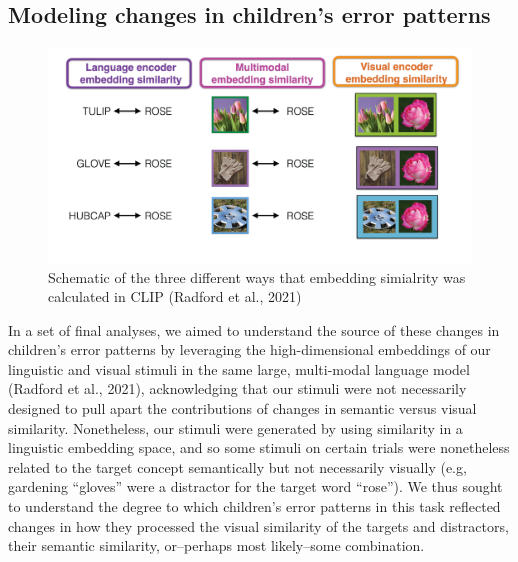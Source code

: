 \documentclass[
  man,floatsintext]{apa6}
\begin{document}
\subsection{Modeling changes in children's error patterns}\label{modeling-changes-in-childrens-error-patterns}

\begin{figure}[H]

{\centering \includegraphics[width=1\linewidth]{embedding_similarity} 

}

\caption{Schematic of the three different ways that embedding simialrity was calculated in CLIP (Radford et al., 2021)}\label{fig:clip-figure}
\end{figure}

In a set of final analyses, we aimed to understand the source of these changes in children's error patterns by leveraging the high-dimensional embeddings of our linguistic and visual stimuli in the same large, multi-modal language model (Radford et al., 2021), acknowledging that our stimuli were not necessarily designed to pull apart the contributions of changes in semantic versus visual similarity. Nonetheless, our stimuli were generated by using similarity in a linguistic embedding space, and so some stimuli on certain trials were nonetheless related to the target concept semantically but not necessarily visually (e.g, gardening ``gloves'' were a distractor for the target word ``rose''). We thus sought to understand the degree to which children's error patterns in this task reflected changes in how they processed the visual similarity of the targets and distractors, their semantic similarity, or--perhaps most likely--some combination.
\end{document}
